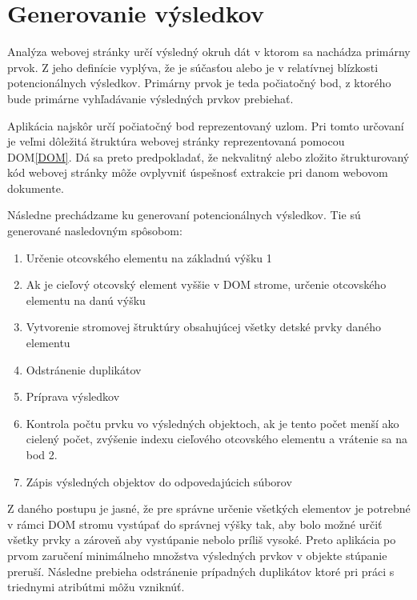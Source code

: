 \newpage

\section{Generovanie výsledkov}

Analýza webovej stránky určí výsledný okruh dát v ktorom sa nachádza primárny prvok. Z jeho definície vyplýva, že je súčasťou alebo je v relatívnej blízkosti potencionálnych výsledkov. Primárny prvok je teda počiatočný bod, z ktorého bude primárne vyhľadávanie výsledných prvkov prebiehať. 

Aplikácia najskôr určí počiatočný bod reprezentovaný uzlom. Pri tomto určovaní je veľmi dôležitá štruktúra webovej stránky reprezentovaná pomocou DOM\ref{DOM}. Dá sa preto predpokladať, že nekvalitný alebo zložito štrukturovaný kód webovej stránky môže ovplyvniť úspešnosť extrakcie pri danom webovom dokumente. 

Následne prechádzame ku generovaní potencionálnych výsledkov. Tie sú generované nasledovným spôsobom:

\bigskip

\begin{enumerate}
    \item Určenie otcovského elementu na základnú výšku 1
    \item Ak je cieľový otcovský element vyššie v DOM strome, určenie otcovského elementu na danú výšku
    \item Vytvorenie stromovej štruktúry obsahujúcej všetky detské prvky daného elementu
    \item Odstránenie duplikátov
    \item Príprava výsledkov
    \item Kontrola počtu prvku vo výsledných objektoch, ak je tento počet menší ako cielený počet, zvýšenie indexu cieľového otcovského elementu a vrátenie sa na bod 2.
    \item Zápis výsledných objektov do odpovedajúcich súborov
\end{enumerate}

\bigskip

Z daného postupu je jasné, že pre správne určenie všetkých elementov je potrebné v rámci DOM stromu vystúpať do správnej výšky tak, aby bolo možné určiť všetky prvky a zároveň aby vystúpanie nebolo príliš vysoké. Preto aplikácia po prvom zaručení minimálneho množstva výsledných prvkov v objekte stúpanie preruší. Následne prebieha odstránenie prípadných duplikátov ktoré pri práci s triednymi atribútmi môžu vzniknúť.

